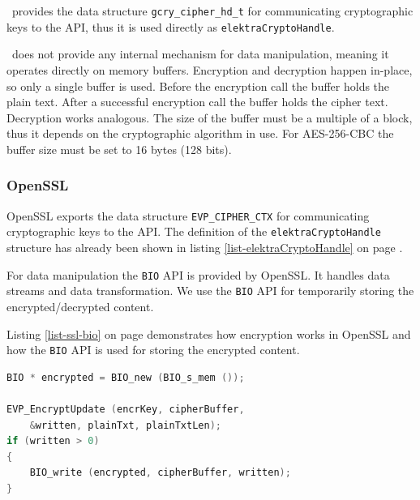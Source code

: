 \gcry ~provides the data structure \texttt{gcry\_cipher\_hd\_t} for communicating cryptographic keys to the API, thus it is used directly as \texttt{elektraCryptoHandle}.
%

\gcry ~does not provide any internal mechanism for data manipulation, meaning it operates directly on memory buffers.
Encryption and decryption happen in-place, so only a single buffer is used.
Before the encryption call the buffer holds the plain text.
After a successful encryption call the buffer holds the cipher text.
Decryption works analogous.
The size of the buffer must be a multiple of a block, thus it depends on the cryptographic algorithm in use.
For AES-256-CBC the buffer size must be set to 16 bytes (128 bits).
\cite{gnupg-doc}

\subsubsection{OpenSSL}

OpenSSL exports the data structure \texttt{EVP\_CIPHER\_CTX} for communicating cryptographic keys to the API. The definition of the \texttt{elektraCryptoHandle} structure has already been shown in listing \ref{list-elektraCryptoHandle} on page \pageref{list-elektraCryptoHandle}.

For data manipulation the \texttt{BIO} API is provided by OpenSSL.
It handles data streams and data transformation.
We use the \texttt{BIO} API for temporarily storing the encrypted/decrypted content.

Listing \ref{list-ssl-bio} on page \pageref{list-ssl-bio} demonstrates how encryption works in OpenSSL and how the \texttt{BIO} API is used for storing the encrypted content. 

\begin{lstlisting}[label=list-ssl-bio,language=C,caption={Encryption in the OpenSSL crypto plugin variant}]
BIO * encrypted = BIO_new (BIO_s_mem ());

EVP_EncryptUpdate (encrKey, cipherBuffer, 
	&written, plainTxt, plainTxtLen);
if (written > 0)
{
	BIO_write (encrypted, cipherBuffer, written);
}
\end{lstlisting}

